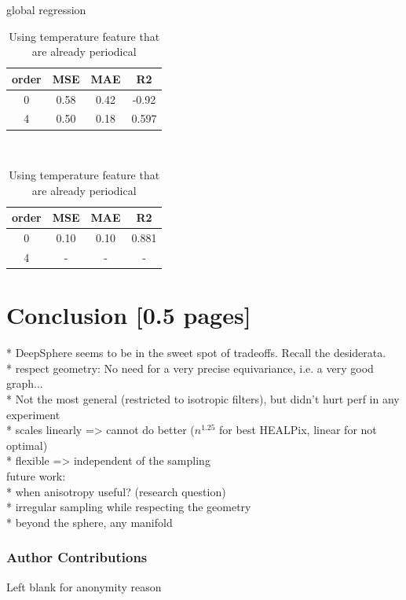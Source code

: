 \documentclass{article} %
\begin{document}
global regression
\begin{table}[!ht]
    \centering
    \begin{tabular}{c|ccc}
        order & MSE & MAE & R2 \\ \hline 
        0 & 0.58 & 0.42 & -0.92\\
        4 & 0.50 & 0.18 & 0.597\\
    \end{tabular}
    \caption{Find day in year using precipitation}
    \label{tab:glob_prec}
    ~\\[1cm]
    \begin{tabular}{c|ccc}
        order & MSE & MAE & R2 \\ \hline 
        0 & 0.10 & 0.10 & 0.881\\
        4 & - & - & -\\
    \end{tabular}
    \caption{Using temperature feature that are already periodical}
    \label{tab:glob_all}
\end{table}

\section{Conclusion [0.5 pages]}

* DeepSphere seems to be in the sweet spot of tradeoffs. Recall the desiderata.\\
  * respect geometry: No need for a very precise equivariance, i.e. a very good graph...\\
  * Not the most general (restricted to isotropic filters), but didn't hurt perf in any experiment\\
  * scales linearly => cannot do better ($n^1.25$ for best HEALPix, linear for not optimal)\\
  * flexible => independent of the sampling\\

future work:\\
* when anisotropy useful? (research question)\\
* irregular sampling while respecting the geometry\\
* beyond the sphere, any manifold\\

\newpage
\subsubsection*{Author Contributions}
Left blank for anonymity reason
\end{document}
